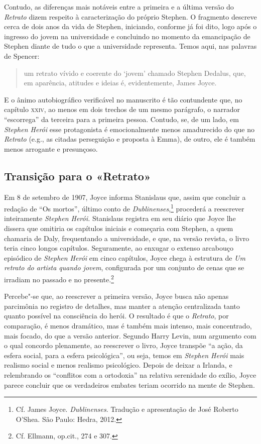 Contudo, as diferenças mais notáveis entre a primeira e a última
versão do \textit{Retrato} dizem respeito à caracterização do próprio
Stephen.  O fragmento descreve cerca de dois anos da vida de Stephen,
iniciando, conforme já foi dito, logo após o ingresso do jovem na
universidade e concluindo no momento da emancipação de Stephen diante
de tudo o que a universidade representa.  Temos aqui, nas palavras de
Spencer:

\begin{quote}
um retrato vívido e coerente do ‘jovem’ chamado Stephen
Dedalus, que, em aparência, atitudes e ideias é, evidentemente, James
Joyce.  
\end{quote}
 
E o ânimo autobiográfico verificável no manuscrito é tão		
contundente que, no capítulo \textsc{xxiv}, ao menos em dois trechos de um mesmo
parágrafo, o narrador “escorrega” da terceira para a primeira pessoa. 
Contudo, se, de um lado, em \textit{Stephen Herói} esse protagonista é
emocionalmente menos amadurecido do que no \textit{Retrato} (e.g., as
citadas perseguição e proposta à Emma), de outro, ele é também menos
arrogante e presunçoso.  


\subsection*{Transição para o «Retrato»}

Em 8 de setembro de 1907, Joyce informa Stanislaus que, assim que
concluir a redação de “Os mortos”, último conto de \textit{Dublinenses},\footnote{ Cf. James Joyce. 
\textit{Dublinenses}. Tradução e apresentação de José Roberto O'Shea. São Paulo: Hedra, 2012.} 
procederá a reescrever inteiramente
\textit{Stephen Herói.}  Stanislaus registra em seu diário que Joyce
lhe dissera que omitiria os capítulos iniciais e começaria com Stephen,
a quem chamaria de Daly, frequentando a universidade, e que, na versão
revista, o livro teria cinco longos capítulos.  Seguramente, ao enxugar
o extenso arcabouço episódico de \textit{Stephen Herói} em cinco
capítulos, Joyce chega à estrutura de \textit{Um retrato do artista
quando jovem}, configurada por um conjunto de cenas que se irradiam no
passado e no presente.\footnote{ Cf. Ellmann, op.cit., 274 e 307.}

Percebe"-se que, ao reescrever a primeira versão, Joyce busca não
apenas parcimônia no registro de detalhes, mas manter a atenção centralizada
tanto quanto possível na consciência do herói.  O resultado é que o
\textit{Retrato}, por comparação, é menos dramático, mas é também mais
intenso, mais concentrado, mais focado, do que a versão anterior. 
Segundo Harry Levin, num argumento com o qual concordo plenamente, ao
reescrever o livro, Joyce transpõe “a ação, da esfera social, para a
esfera psicológica”, ou seja, temos em \textit{Stephen Herói} mais	
realismo social e menos realismo psicológico.  Depois de deixar a
Irlanda, e relembrando os “conflitos com a ortodoxia” na relativa
serenidade do exílio, Joyce parece concluir que os verdadeiros embates
teriam ocorrido na mente de Stephen.


